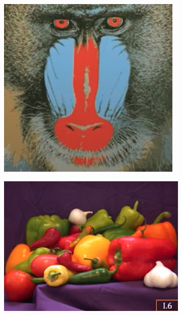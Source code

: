 \begin{figure}[h!]
\begin{subfigure}[b]{0.4\textwidth}
         \caption{}
         \label{}
     \end{subfigure}
     \hfill
     \begin{subfigure}[b]{0.4\textwidth}
         \centering
         \includegraphics[width=\textwidth]{img/scimmia_k=8.png}
         \caption{}
         \label{}
     \end{subfigure}
     \hfill
     \begin{subfigure}[b]{0.45\textwidth}
         \centering
         \includegraphics[width=\textwidth]{img/frutta.png}

\end{subfigure}
\end{figure}
